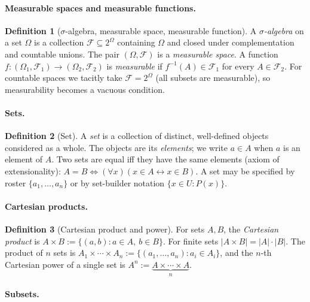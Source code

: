 \documentclass[11pt]{article}
\theoremstyle{definition}
\newtheorem{definition}{Definition}
\begin{document}
\paragraph{Measurable spaces and measurable functions.}

\begin{definition}[$\sigma$-algebra, measurable space, measurable function]
A \emph{$\sigma$-algebra} on a set $\Omega$ is a collection
$\mathcal{F} \subseteq 2^{\Omega}$ containing $\Omega$ and closed under
complementation and countable unions. The pair $(\Omega, \mathcal{F})$ is a
\emph{measurable space}. A function
$f : (\Omega_{1}, \mathcal{F}_{1}) \to (\Omega_{2}, \mathcal{F}_{2})$ is
\emph{measurable} if $f^{-1}(A) \in \mathcal{F}_{1}$ for every
$A \in \mathcal{F}_{2}$. For countable spaces we tacitly take
$\mathcal{F} = 2^{\Omega}$ (all subsets are measurable), so measurability
becomes a vacuous condition.
\end{definition}

\paragraph{Sets.}

\begin{definition}[Set]
A \emph{set} is a collection of distinct, well-defined objects considered as a
whole. The objects are its \emph{elements}; we write $a \in A$ when $a$ is an
element of $A$. Two sets are equal iff they have the same elements (axiom of
extensionality):
\(
  A = B \iff (\forall x)(x \in A \leftrightarrow x \in B).
\)
A set may be specified by roster $\{a_1, \dots, a_n\}$ or by set-builder
notation $\{x \in U : P(x)\}$.
\end{definition}

\paragraph{Cartesian products.}

\begin{definition}[Cartesian product and power]
For sets $A, B$, the \emph{Cartesian product} is
\(
  A \times B := \{(a, b) : a \in A,\ b \in B\}.
\)
For finite sets $|A \times B| = |A| \cdot |B|$. The product of $n$ sets is
$A_1 \times \cdots \times A_n := \{(a_1, \dots, a_n) : a_i \in A_i\}$, and the
$n$-th Cartesian power of a single set is
$A^n := \underbrace{A \times \cdots \times A}_{n}$.
\end{definition}

\paragraph{Subsets.}
\end{document}
